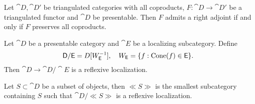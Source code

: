 \begin{theorem}
	Let $\cat{D},\cat{D}'$ be triangulated categories with all coproducts, $F:\cat{D}\to \cat{D}'$ be a triangulated functor and $\cat{D}$ be presentable. Then $F$ admits a right adjoint if and only if $F$ preserves all coproducts.
\end{theorem}
\begin{corollary}
	Let $\cat{D}$ be a presentable category and $\cat{E}$ be a localizing subcategory. Define
	\[
		\mathsf{D} / \mathsf{E} = D[W_{\mathsf{E}}^{-1}],\quad W_{\mathsf{E}} = \{f:\operatorname{Cone}(f)\in \mathsf{E}\} 
	.\] 
	Then $\cat{D} \to \cat{D} /\cat{E}$ is a reflexive localization.
\end{corollary}
Let $S\subset \cat{D}$ be a subset of objects, then $\ll S \gg$ is the smallest subcategory containing $S$ such that $\cat{D} /\ll S\gg$ is a reflexive localization.

